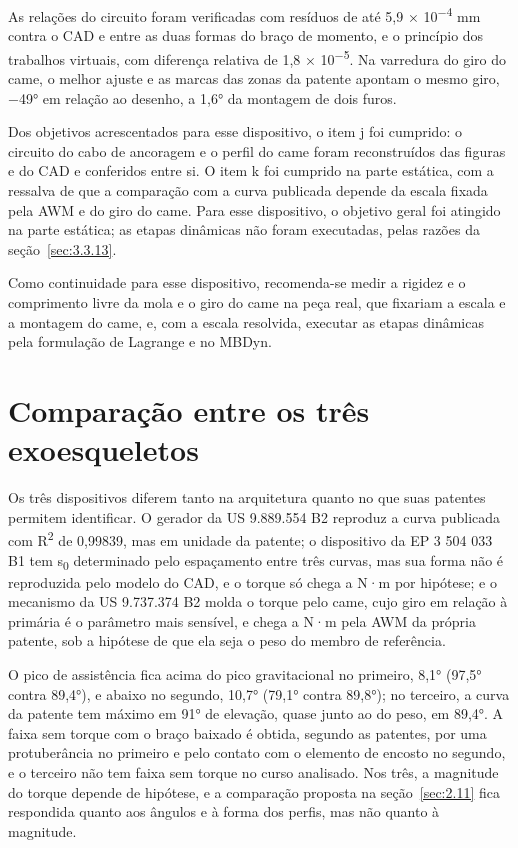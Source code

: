 As relações do circuito foram verificadas com resíduos de até 5,9 × 10\textsuperscript{−4} mm contra o CAD e entre as duas formas do braço de momento, e o princípio dos trabalhos virtuais, com diferença relativa de 1,8 × 10\textsuperscript{−5}. Na varredura do giro do came, o melhor ajuste e as marcas das zonas da patente apontam o mesmo giro, −49° em relação ao desenho, a 1,6° da montagem de dois furos.

Dos objetivos acrescentados para esse dispositivo, o item j foi cumprido: o circuito do cabo de ancoragem e o perfil do came foram reconstruídos das figuras e do CAD e conferidos entre si. O item k foi cumprido na parte estática, com a ressalva de que a comparação com a curva publicada depende da escala fixada pela AWM e do giro do came. Para esse dispositivo, o objetivo geral foi atingido na parte estática; as etapas dinâmicas não foram executadas, pelas razões da seção~\ref{sec:3.3.13}.

Como continuidade para esse dispositivo, recomenda-se medir a rigidez e o comprimento livre da mola e o giro do came na peça real, que fixariam a escala e a montagem do came, e, com a escala resolvida, executar as etapas dinâmicas pela formulação de Lagrange e no MBDyn.

\section{Comparação entre os três exoesqueletos}\label{sec:5.4}

Os três dispositivos diferem tanto na arquitetura quanto no que suas patentes permitem identificar. O gerador da US 9.889.554 B2 reproduz a curva publicada com R\textsuperscript{2} de 0,99839, mas em unidade da patente; o dispositivo da EP 3 504 033 B1 tem s\textsubscript{0} determinado pelo espaçamento entre três curvas, mas sua forma não é reproduzida pelo modelo do CAD, e o torque só chega a N·m por hipótese; e o mecanismo da US 9.737.374 B2 molda o torque pelo came, cujo giro em relação à primária é o parâmetro mais sensível, e chega a N·m pela AWM da própria patente, sob a hipótese de que ela seja o peso do membro de referência.

O pico de assistência fica acima do pico gravitacional no primeiro, 8,1° (97,5° contra 89,4°), e abaixo no segundo, 10,7° (79,1° contra 89,8°); no terceiro, a curva da patente tem máximo em 91° de elevação, quase junto ao do peso, em 89,4°. A faixa sem torque com o braço baixado é obtida, segundo as patentes, por uma protuberância no primeiro e pelo contato com o elemento de encosto no segundo, e o terceiro não tem faixa sem torque no curso analisado. Nos três, a magnitude do torque depende de hipótese, e a comparação proposta na seção~\ref{sec:2.11} fica respondida quanto aos ângulos e à forma dos perfis, mas não quanto à magnitude.
